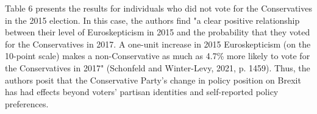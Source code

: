 \documentclass[12pt,letterpaper]{article}
\begin{document}
	Table 6 presents the results for individuals who did not vote for the Conservatives in the 2015 election. In this case, the authors find "a clear positive relationship between their level of Euroskepticism in 2015 and the probability that they voted for the Conservatives in 2017. A one-unit increase in 2015 Euroskepticism (on the 10-point scale) makes a non-Conservative as much as 4.7\% more likely to vote for the Conservatives in 2017" (Schonfeld and Winter-Levy, 2021, p. 1459). Thus, the authors posit that the Conservative Party's change in policy position on Brexit has had effects beyond voters’ partisan identities and self-reported policy preferences.
	\begin{table}[H] \centering
		\caption{Euroskepticism and Switching Vote to Conservatives} 
		\label{tab:euroskepticswitch} 
\end{table}
\end{document}
